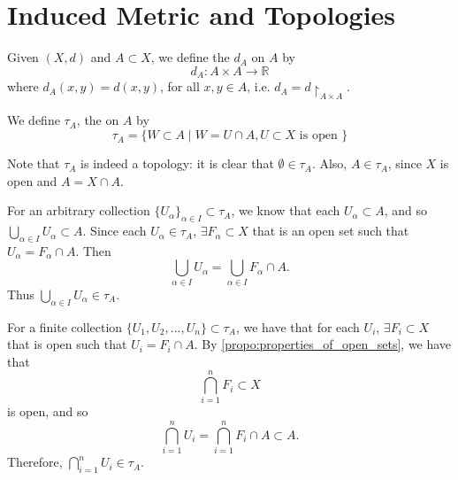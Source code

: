 \documentclass[notoc,notitlepage]{tufte-book}
\begin{document}
\section{Induced Metric and Topologies}%
\label{sec:induced_metric_and_topologies}

\begin{defn}\label{defn:induced_metric_n_induced_topology}
  Given $(X, d)$ and $A \subset X$, we define the  $d_A$ on $A$ by
  \begin{equation*}
    d_A : A \times A \to \mathbb{R}
  \end{equation*}
  where $d_A(x, y) = d(x, y)$, for all $x, y \in A$, i.e. $d_A = d \restriction_{A \times A}$.

  We define $\tau_A$, the  on $A$ by
  \begin{equation*}
    \tau_A = \{ W \subset A \mid W = U \cap A, U \subset X \text{ is open } \}
  \end{equation*}
\end{defn}

\begin{note}
  Note that $\tau_A$ is indeed a topology: it is clear that $\emptyset \in \tau_A$. Also, $A \in \tau_A$, since $X$ is open and $A = X \cap A$.

  For an arbitrary collection $\{ U_\alpha \}_{\alpha \in I} \subset \tau_A$, we know that each $U_\alpha \subset A$, and so $\bigcup_{\alpha \in I} U_\alpha \subset A$. Since each $U_\alpha \in \tau_A$, $\exists F_\alpha \subset X$ that is an open set such that $U_\alpha = F_\alpha \cap A$. Then
  \begin{equation*}
    \bigcup_{\alpha \in I} U_\alpha = \bigcup_{\alpha \in I} F_{\alpha} \cap A.
  \end{equation*}
  Thus $\bigcup_{\alpha \in I} U_\alpha \in \tau_A$.

  For a finite collection $\{ U_1, U_2, ..., U_n \} \subset \tau_A$, we have that for each $U_i$, $\exists F_i \subset X$ that is open such that $U_i = F_i \cap A$. By \cref{propo:properties_of_open_sets}, we have that
  \begin{equation*}
    \bigcap_{i = 1}^{n} F_i \subset X
  \end{equation*}
  is open, and so
  \begin{equation*}
    \bigcap_{i = 1}^{n} U_i = \bigcap_{i = 1}^{n} F_i \cap A \subset A.
  \end{equation*}
  Therefore, $\bigcap_{i = 1}^{n} U_i \in \tau_A$.
\end{note}
\end{document}
